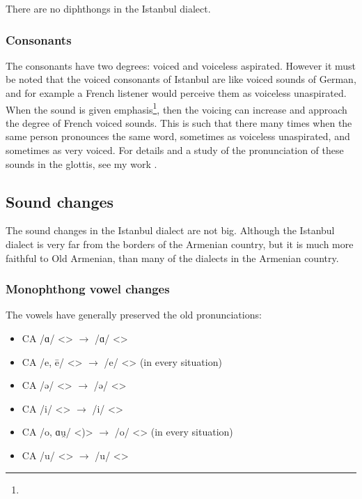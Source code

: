 \begin{adjarianpage}\label{page:250}\end{adjarianpage}%


There are no diphthongs in the Istanbul dialect.

\subsubsection{Consonants}

The consonants have two degrees: voiced and voiceless aspirated. However it must be noted that the voiced consonants of Istanbul are like voiced sounds of German, and for example a French listener would perceive them as voiceless unaspirated. When the sound is given emphasis\footnote{}, then the voicing can increase and approach the degree of French voiced sounds. This is such that there many times when the same person pronounces the same word, sometimes as voiceless unaspirated, and sometimes as very voiced. For details and a study of the pronunciation of these sounds in the glottis, see my work \citep{Adjarian-1899-ArmenianExplosives}. 

\subsection{Sound changes}\label{sec:Istanbul:phono:soundchange}
The sound changes in the Istanbul dialect are not big. Although the Istanbul dialect is very far from the borders of the Armenian country, but it is much more faithful to Old Armenian, than many of the dialects in the Armenian country. 

\subsubsection{Monophthong vowel changes}

The vowels have generally preserved the old pronunciations:
\begin{itemize}
	\item CA /ɑ/ <> $\rightarrow$ /ɑ/ <> 
	\item CA /e, ē/ <> $\rightarrow$ /e/ <> (in every situation)
	\item CA /ə/ <> $\rightarrow$ /ə/ <> 
	\item CA /i/ <> $\rightarrow$ /i/ <> 
	\item CA /o, ɑu̯/ <)> $\rightarrow$ /o/ <> (in every situation)
	\item CA /u/ <> $\rightarrow$ /u/ <> 
\end{itemize}

